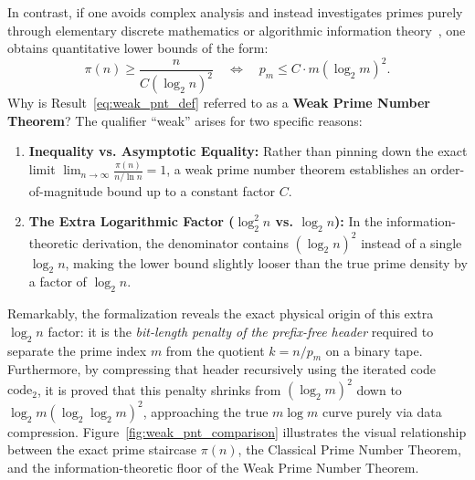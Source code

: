 \documentclass[acmsmall,natbib=false,nonacm]{acmart}
\begin{document}
In contrast, if one avoids complex analysis and instead investigates primes purely through elementary discrete mathematics or algorithmic information theory~\cite{schoning1998gems}, one obtains quantitative lower bounds of the form:
\begin{equation}
    \label{eq:weak_pnt_def}
    \pi(n) \ge \frac{n}{C (\log_2 n)^2} \quad \Longleftrightarrow \quad p_m \le C \cdot m (\log_2 m)^2.
\end{equation}
Why is Result~\eqref{eq:weak_pnt_def} referred to as a \textbf{Weak Prime Number Theorem}? The qualifier ``weak'' arises for two specific reasons:
\begin{enumerate}
    \item \textbf{Inequality vs. Asymptotic Equality:} Rather than pinning down the exact limit $\lim_{n\to\infty} \frac{\pi(n)}{n/\ln n} = 1$, a weak prime number theorem establishes an order-of-magnitude bound up to a constant factor $C$.
    \item \textbf{The Extra Logarithmic Factor ($\log_2^2 n$ vs. $\log_2 n$):} In the information-theoretic derivation, the denominator contains $(\log_2 n)^2$ instead of a single $\log_2 n$, making the lower bound slightly looser than the true prime density by a factor of $\log_2 n$.
\end{enumerate}

Remarkably, the formalization reveals the exact physical origin of this extra $\log_2 n$ factor: it is the \textit{bit-length penalty of the prefix-free header} required to separate the prime index $m$ from the quotient $k = n / p_m$ on a binary tape. Furthermore, by compressing that header recursively using the iterated code $\text{code}_2$, it is proved that this penalty shrinks from $(\log_2 m)^2$ down to $\log_2 m (\log_2 \log_2 m)^2$, approaching the true $m \log m$ curve purely via data compression. Figure~\ref{fig:weak_pnt_comparison} illustrates the visual relationship between the exact prime staircase $\pi(n)$, the Classical Prime Number Theorem, and the information-theoretic floor of the Weak Prime Number Theorem.
\end{document}
